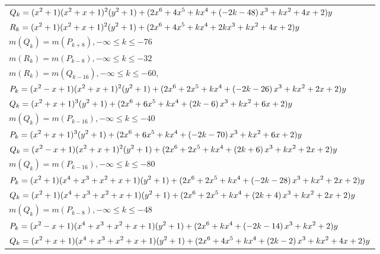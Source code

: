 \documentclass{amsart}
\begin{document}
\begin{longtable}{|l|}
\(\displaystyle Q_k=(x^2
 + 1)(x^2
 + x
 + 1)^{2}(y^2+1)+(2\*x^6
 + 4\*x^5
 + k\*x^4
 + \left(-2\*k
 - 48\right) \*x^3
 + k\*x^2
 + 4\*x
 + 2)y\)\\
\(\displaystyle R_k=(x^2
 + 1)(x^2
 + x
 + 1)^{2}(y^2+1)+(2\*x^6
 + 4\*x^5
 + k\*x^4
 + 2\*k\*x^3
 + k\*x^2
 + 4\*x
 + 2)y\)\\
\(\displaystyle m(Q_k) = m(P_{k
 + 8}),-\infty \leqslant k \leqslant -76\)\\
\(\displaystyle m(R_k) = m(P_{k
 - 8}),-\infty \leqslant k \leqslant -32\)\\
\(\displaystyle m(R_k) = m(Q_{k
 - 16}),-\infty \leqslant k \leqslant -60,\quad \)\\
\hline
\(\displaystyle P_k=(x^2
 - x
 + 1)(x^2
 + x
 + 1)^{2}(y^2+1)+(2\*x^6
 + 2\*x^5
 + k\*x^4
 + \left(-2\*k
 - 26\right) \*x^3
 + k\*x^2
 + 2\*x
 + 2)y\)\\
\(\displaystyle Q_k=(x^2
 + x
 + 1)^{3}(y^2+1)+(2\*x^6
 + 6\*x^5
 + k\*x^4
 + \left(2\*k
 - 6\right) \*x^3
 + k\*x^2
 + 6\*x
 + 2)y\)\\
\(\displaystyle m(Q_k) = m(P_{k
 - 16}),-\infty \leqslant k \leqslant -40\)\\
\hline
\(\displaystyle P_k=(x^2
 + x
 + 1)^{3}(y^2+1)+(2\*x^6
 + 6\*x^5
 + k\*x^4
 + \left(-2\*k
 - 70\right) \*x^3
 + k\*x^2
 + 6\*x
 + 2)y\)\\
\(\displaystyle Q_k=(x^2
 - x
 + 1)(x^2
 + x
 + 1)^{2}(y^2+1)+(2\*x^6
 + 2\*x^5
 + k\*x^4
 + \left(2\*k
 + 6\right) \*x^3
 + k\*x^2
 + 2\*x
 + 2)y\)\\
\(\displaystyle m(Q_k) = m(P_{k
 - 16}),-\infty \leqslant k \leqslant -80\)\\
\hline
\(\displaystyle P_k=(x^2
 + 1)(x^4
 + x^3
 + x^2
 + x
 + 1)(y^2+1)+(2\*x^6
 + 2\*x^5
 + k\*x^4
 + \left(-2\*k
 - 28\right) \*x^3
 + k\*x^2
 + 2\*x
 + 2)y\)\\
\(\displaystyle Q_k=(x^2
 + 1)(x^4
 + x^3
 + x^2
 + x
 + 1)(y^2+1)+(2\*x^6
 + 2\*x^5
 + k\*x^4
 + \left(2\*k
 + 4\right) \*x^3
 + k\*x^2
 + 2\*x
 + 2)y\)\\
\(\displaystyle m(Q_k) = m(P_{k
 - 8}),-\infty \leqslant k \leqslant -48\)\\
\hline
\(\displaystyle P_k=(x^2
 - x
 + 1)(x^4
 + x^3
 + x^2
 + x
 + 1)(y^2+1)+(2\*x^6
 + k\*x^4
 + \left(-2\*k
 - 14\right) \*x^3
 + k\*x^2
 + 2)y\)\\
\(\displaystyle Q_k=(x^2
 + x
 + 1)(x^4
 + x^3
 + x^2
 + x
 + 1)(y^2+1)+(2\*x^6
 + 4\*x^5
 + k\*x^4
 + \left(2\*k
 - 2\right) \*x^3
 + k\*x^2
 + 4\*x
 + 2)y\)\\

\end{longtable}
\end{document}
